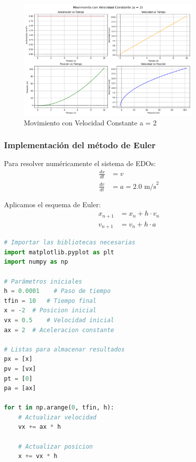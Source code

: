 \documentclass{article}
\begin{document}
\begin{center}
    \begin{figure}[H]
    \centering
    \includegraphics[width=0.8\textwidth]{img/1-1.png} 
    \caption{Movimiento con Velocidad Constante a = 2}
    \label{fig:salida_consola}
\end{figure}

	\subsubsection{Implementación del método de Euler}
	
	Para resolver numéricamente el sistema de EDOs:
	\begin{align}
		\frac{dx}{dt} &= v \\
		\frac{dv}{dt} &= a = 2.0 \text{ m/s}^2
	\end{align}
	
	Aplicamos el esquema de Euler:
	\begin{align}
		x_{n+1} &= x_n + h \cdot v_n \\
		v_{n+1} &= v_n + h \cdot a
	\end{align}
	
	\begin{lstlisting}[language=Python, caption={Implementación detallada del método de Euler}]
# Importar las bibliotecas necesarias
import matplotlib.pyplot as plt
import numpy as np

# Parámetros iniciales
h = 0.0001    # Paso de tiempo
tfin = 10   # Tiempo final
x = -2  # Posicion inicial
vx = 0.5    # Velocidad inicial
ax = 2  # Aceleracion constante

# Listas para almacenar resultados
px = [x]
pv = [vx]
pt = [0]
pa = [ax]

for t in np.arange(0, tfin, h):
    # Actualizar velocidad
    vx += ax * h

    # Actualizar posicion
    x += vx * h


\end{lstlisting}
\end{center}
\end{document}
